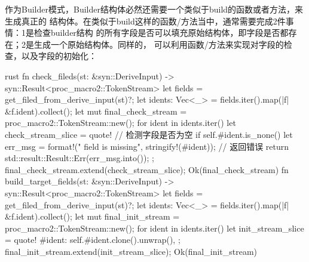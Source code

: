 作为Builder模式，Builder结构体必然还需要一个类似于build的函数或者方法，来生成真正的
结构体。在类似于build这样的函数/方法当中，通常需要完成2件事情：1是检查builder结构
的所有字段是否可以填充原始结构体，即字段是否都存在；2是生成一个原始结构体。同样的，
可以利用函数/方法来实现对字段的检查，以及字段的初始化：
\begin{code-block}{rust}
fn check_fileds(st: &syn::DeriveInput) -> syn::Result<proc_macro2::TokenStream> {
    let fields = get_filed_from_derive_input(st)?;
    let idents: Vec<_> = fields.iter().map(|f| &f.ident).collect();
    let mut final_check_stream = proc_macro2::TokenStream::new();
    for ident in idents.iter() {
        let check_stream_slice = quote! {
            // 检测字段是否为空
            if self.#ident.is_none() {
                let err_msg = format!("{} field is missing", stringify!(#ident));
                // 返回错误
                return std::result::Result::Err(err_msg.into());
            }
        };
        final_check_stream.extend(check_stream_slice);
    }
    Ok(final_check_stream)
}
fn build_target_fields(st: &syn::DeriveInput) -> syn::Result<proc_macro2::TokenStream> {
    let fields = get_filed_from_derive_input(st)?;
    let idents: Vec<_> = fields.iter().map(|f| &f.ident).collect();
    let mut final_init_stream = proc_macro2::TokenStream::new();
    for ident in idents.iter() {
        let init_stream_slice = quote! {
            #ident: self.#ident.clone().unwrap(),
        };
        final_init_stream.extend(init_stream_slice);
    }
    Ok(final_init_stream)
}
\end{code-block}

